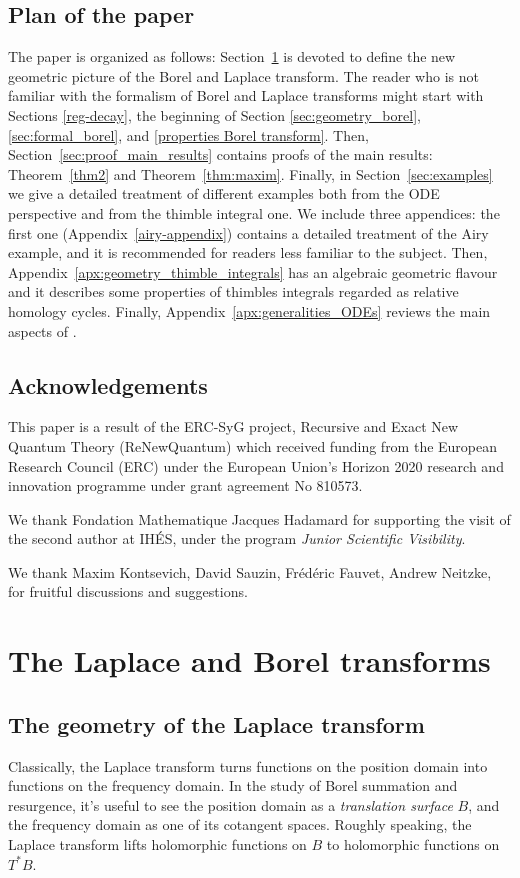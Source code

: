\documentclass{article}
\theoremstyle{definition}
\theoremstyle{plain}
\begin{document}
\subsection{Plan of the paper}
The paper is organized as follows: Section~\ref{sec:Laplace-Borel-general} is devoted to define the new geometric picture of the Borel and Laplace transform. The reader who is not familiar with the formalism of Borel and Laplace transforms might start with Sections \ref{reg-decay}, the beginning of Section \ref{sec:geometry_borel},  \ref{sec:formal_borel}, and \ref{properties Borel transform}. Then, Section~\ref{sec:proof_main_results} contains proofs of the main results: Theorem~\ref{thm2} and Theorem~\ref{thm:maxim}. Finally, in Section~\ref{sec:examples} we give a detailed treatment of different examples both from the ODE perspective and from the thimble integral one. 
We include three appendices: the first one (Appendix~\ref{airy-appendix}) contains a detailed treatment of the Airy example, and it is recommended for readers less familiar to the subject. Then, Appendix~\ref{apx:geometry_thimble_integrals} has an algebraic geometric flavour and it describes some properties of thimbles integrals regarded as relative homology cycles. Finally, Appendix~\ref{apx:generalities_ODEs} reviews the main aspects of \cite{reg-sing-volterra}.  
%
\subsection{Acknowledgements}
This paper is a result of the ERC-SyG project, Recursive and Exact New Quantum Theory (ReNewQuantum) which received funding from the European Research Council (ERC) under the European Union's Horizon 2020 research and innovation programme under grant agreement No 810573. 

We thank Fondation Mathematique Jacques Hadamard for supporting the visit of the second author at IH\'ES, under the program \textit{Junior Scientific Visibility}. 

We thank Maxim Kontsevich, David Sauzin, Fr\'ed\'eric Fauvet, Andrew Neitzke, for fruitful discussions and suggestions. 
%
\section{The Laplace and Borel transforms}\label{sec:Laplace-Borel-general}
\subsection{The geometry of the Laplace transform}
Classically, the Laplace transform turns functions on the position domain into functions on the frequency domain. In the study of Borel summation and resurgence, it's useful to see the position domain as a {\em translation surface} $B$, and the frequency domain as one of its cotangent spaces. Roughly speaking, the Laplace transform lifts holomorphic functions on $B$ to holomorphic functions on $T^* B$.
%
\end{document}
